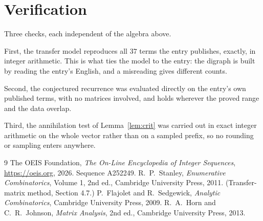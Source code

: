 \documentclass[11pt,a4paper]{article}
\theoremstyle{plain}
\theoremstyle{definition}
\begin{document}
\section{Verification}

Three checks, each independent of the algebra above.

First, the transfer model reproduces all $37$ terms the entry publishes, exactly, in
integer arithmetic. This is what ties the model to the entry: the digraph is built by reading
the entry's English, and a misreading gives different counts.

Second, the conjectured recurrence was evaluated directly on the entry's own published terms,
with no matrices involved, and holds wherever the proved range and the data overlap.

Third, the annihilation test of Lemma~\ref{lem:crit} was carried out in exact integer
arithmetic on the whole vector rather than on a sampled prefix, so no rounding or sampling
enters anywhere.

\begin{thebibliography}{9}
 The OEIS Foundation, \emph{The On-Line Encyclopedia of Integer
Sequences}, \url{https://oeis.org}, 2026. Sequence A252249.
 R.~P.~Stanley, \emph{Enumerative Combinatorics}, Volume 1, 2nd ed.,
Cambridge University Press, 2011. (Transfer-matrix method, Section 4.7.)
 P.~Flajolet and R.~Sedgewick, \emph{Analytic Combinatorics}, Cambridge
University Press, 2009.
 R.~A.~Horn and C.~R.~Johnson, \emph{Matrix Analysis}, 2nd ed., Cambridge
University Press, 2013.
\end{thebibliography}
\end{document}

